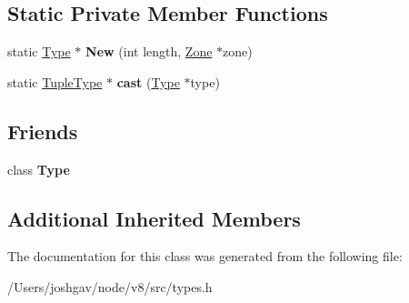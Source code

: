 \subsection*{Static Private Member Functions}
\begin{DoxyCompactItemize}
\item 
static \hyperlink{classv8_1_1internal_1_1_type}{Type} $\ast$ {\bfseries New} (int length, \hyperlink{classv8_1_1internal_1_1_zone}{Zone} $\ast$zone)\hypertarget{classv8_1_1internal_1_1_tuple_type_ab5fb1ecbab75a6fbd3f4d64bd10ecc20}{}\label{classv8_1_1internal_1_1_tuple_type_ab5fb1ecbab75a6fbd3f4d64bd10ecc20}

\item 
static \hyperlink{classv8_1_1internal_1_1_tuple_type}{Tuple\+Type} $\ast$ {\bfseries cast} (\hyperlink{classv8_1_1internal_1_1_type}{Type} $\ast$type)\hypertarget{classv8_1_1internal_1_1_tuple_type_a62aca24a1def7c8dc4edda09a562d09d}{}\label{classv8_1_1internal_1_1_tuple_type_a62aca24a1def7c8dc4edda09a562d09d}

\end{DoxyCompactItemize}
\subsection*{Friends}
\begin{DoxyCompactItemize}
\item 
class {\bfseries Type}\hypertarget{classv8_1_1internal_1_1_tuple_type_a18dba29b4f3e91d6d2bc53472a6bb7cc}{}\label{classv8_1_1internal_1_1_tuple_type_a18dba29b4f3e91d6d2bc53472a6bb7cc}

\end{DoxyCompactItemize}
\subsection*{Additional Inherited Members}


The documentation for this class was generated from the following file\+:\begin{DoxyCompactItemize}
\item 
/\+Users/joshgav/node/v8/src/types.\+h\end{DoxyCompactItemize}
